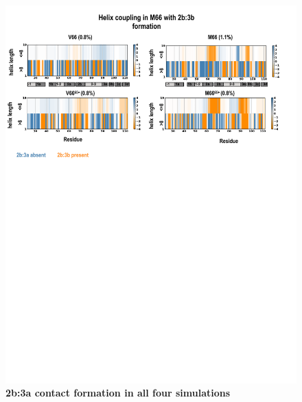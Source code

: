 \documentclass[journal=jacsat,manuscript=article]{achemso}
\begin{document}
\begin{figure}[!ht]
\includegraphics[scale=0.5,width=12cm,trim={0 0cm 0 0cm},clip]{../figures/coupling_3.pdf}
\caption{{\bf 2b:3a contact formation in all four simulations}
 }
\label{fig6}
\end{figure}
\end{document}
